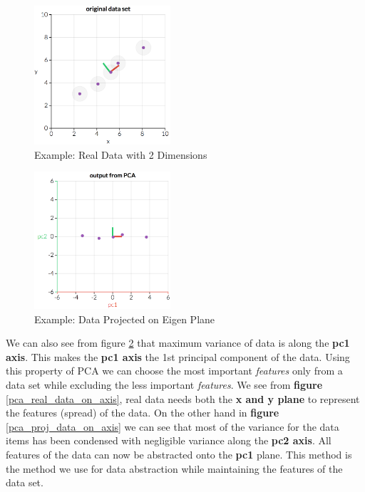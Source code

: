 \documentclass{vldb}
\begin{document}
  \begin{figure}[t!]
    \includegraphics[width=0.45\textwidth]{pca_real_data}
    \caption{Example: Real Data with 2 Dimensions\cite{pca_visual}}
    \centering
    \label{subfig:pca_real_data}
\end{figure}

\begin{figure}[t!]
    \includegraphics[width=0.45\textwidth]{pca_proj_data}
    \caption{Example: Data Projected on Eigen Plane\cite{pca_visual}}
    \centering
    \label{subfig:pca_proj_data}
\end{figure}
  
  We can also see from figure \ref{subfig:pca_proj_data} that maximum variance of data is along the \textbf{pc1 axis}. This makes the \textbf{pc1 axis} the 1st principal component of the data. Using this property of PCA we can choose the most important \textit{features} only from a data set while excluding the less important \textit{features}. We see from \textbf{figure} \ref{pca_real_data_on_axis}, real data needs both the \textbf{x and y plane} to represent the features (spread) of the data. On the other hand in \textbf{figure} \ref{pca_proj_data_on_axis} we can see that most of the variance for the data items has been condensed with negligible variance along the \textbf{pc2 axis}. All features of the data can now be abstracted onto the \textbf{pc1} plane. This method is the method we use for data abstraction while maintaining the features of the data set.%
 
\end{document}
